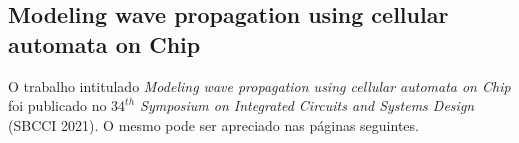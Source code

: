 \begin{apendicesenv}
\chapter{Modeling wave propagation using cellular automata on Chip}

O trabalho intitulado \textit{Modeling wave propagation using cellular automata on Chip} foi publicado no \textit{ $34^{th}$ Symposium on Integrated Circuits and Systems Design} (SBCCI 2021). O mesmo pode ser apreciado nas páginas seguintes. 



\end{apendicesenv}